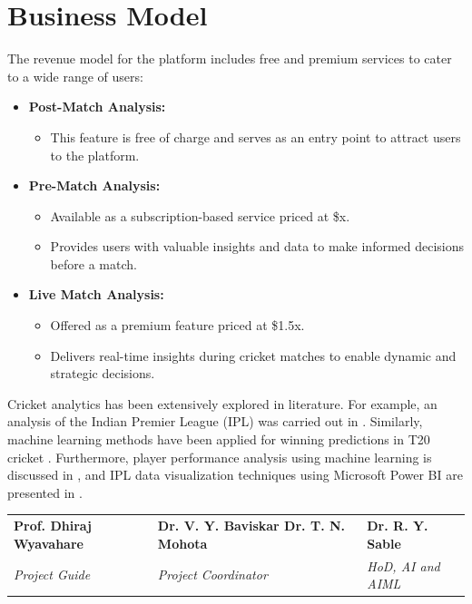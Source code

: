 \section{Business Model}
The revenue model for the platform includes free and premium services to cater to a wide range of users:
\begin{itemize}
    \item \textbf{Post-Match Analysis:} 
    \begin{itemize}
        \item This feature is free of charge and serves as an entry point to attract users to the platform.
    \end{itemize}
    \item \textbf{Pre-Match Analysis:}
    \begin{itemize}
        \item Available as a subscription-based service priced at \$x.
        \item Provides users with valuable insights and data to make informed decisions before a match.
    \end{itemize}
    \item \textbf{Live Match Analysis:}
    \begin{itemize}
        \item Offered as a premium feature priced at \$1.5x.
        \item Delivers real-time insights during cricket matches to enable dynamic and strategic decisions.
    \end{itemize}
\end{itemize}

	
	
	
	


Cricket analytics has been extensively explored in literature. For example, an analysis of the Indian Premier League (IPL) was carried out in \cite{ipl_analysis_prediction}. 
Similarly, machine learning methods have been applied for winning predictions in T20 cricket \cite{t20_prediction}.
Furthermore, player performance analysis using machine learning is discussed in \cite{player_performance_analysis}, 
and IPL data visualization techniques using Microsoft Power BI are presented in \cite{ipl_visualization}.




\vfill %

\begin{center}
\begin{tabular}{>{\centering\arraybackslash}m{}  %
                >{\centering\arraybackslash}m{}  %
                >{\centering\arraybackslash}m{}} %
    \textbf{Prof. Dhiraj Wyavahare} & \textbf{Dr. V. Y. Baviskar Dr. T. N. Mohota} & \textbf{Dr. R. Y. Sable} \\ 
    \textit{Project Guide} & \textit{Project Coordinator} & \textit{HoD, AI and AIML} \\
\end{tabular}
\end{center}

